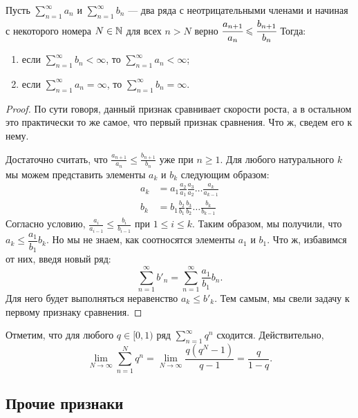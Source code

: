 \begin{Test}
	Пусть $\sum\limits_{n=1}^{\infty} a_n$ и $\sum\limits_{n=1}^{\infty} b_n$ --- два ряда с неотрицательными членами и начиная с некоторого номера $N\in\mathbb{N}$ для всех $n>N$ верно $\cfrac{a_{n+1}}{a_n} \leqslant \cfrac{b_{n+1}}{b_n}$ Тогда: \begin{enumerate}
		\item если $\sum\limits_{n=1}^{\infty} b_n < \infty$, то $\sum\limits_{n=1}^{\infty} a_n < \infty$;
		\item если $\sum\limits_{n=1}^{\infty} a_n = \infty$, то $\sum\limits_{n=1}^{\infty} b_n = \infty$. 
	\end{enumerate}
\end{Test}
\begin{proof}
	По сути говоря, данный признак сравнивает скорости роста, а в остальном это практически то же самое, что первый признак сравнения. Что ж, сведем его к нему.
	
	Достаточно считать, что $\frac{a_{n+1}}{a_n} \leqslant \frac{b_{n+1}}{b_n}$ уже при $n \ge 1$. Для любого натурального $k$ мы можем представить элементы $a_k$ и $b_k$ следующим образом:
	\begin{align*}
	a_k &= a_1 \frac{a_2}{a_1}\frac{a_3}{a_2} \ldots \frac{a_k}{a_{k-1}} \\
	b_k &= b_1 \frac{b_2}{b_1}\frac{b_3}{b_2} \ldots \frac{b_k}{b_{k-1}}
	\end{align*}
	Согласно условию, $\frac{a_{i}}{a_{i-1}} \le \frac{b_i}{b_{i-1}}$ при $1 \le i \le k$. Таким образом, мы получили, что $a_k \le \dfrac{a_1}{b_1}b_k$. Но мы не знаем, как соотносятся элементы $a_1$ и $b_1$. Что ж, избавимся от них, введя новый ряд:
	$$
	\sum\limits_{n=1}^{\infty} b'_n = \sum\limits_{n=1}^{\infty}\frac{a_1}{b_1}b_n.
	$$ 
	Для него будет выполняться неравенство $a_k \le b'_k$. Тем самым, мы свели задачу к первому признаку сравнения.
\end{proof}

\begin{Comment}
	Отметим, что для любого $q \in [0,1)$ ряд $\sum\limits_{n=1}^{\infty} q^n$ сходится. Действительно, $$\lim\limits_{N\rightarrow\infty} \sum\limits_{n=1}^{N} q^n=\lim\limits_{N\rightarrow\infty}\frac{q(q^N-1)}{q-1} = \frac{q}{1-q}.$$
\end{Comment}

\subsection{Прочие признаки}


